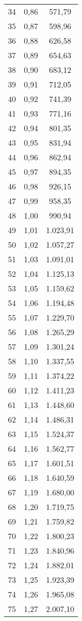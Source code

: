 \documentclass[]{article}
\begin{document}
\begin{longtable}[t]{ccc}
34 & 0,86 & 571,79\\
35 & 0,87 & 598,96\\
36 & 0,88 & 626,58\\
37 & 0,89 & 654,63\\
38 & 0,90 & 683,12\\
39 & 0,91 & 712,05\\
40 & 0,92 & 741,39\\
41 & 0,93 & 771,16\\
42 & 0,94 & 801,35\\
43 & 0,95 & 831,94\\
44 & 0,96 & 862,94\\
45 & 0,97 & 894,35\\
46 & 0,98 & 926,15\\
47 & 0,99 & 958,35\\
48 & 1,00 & 990,94\\
49 & 1,01 & 1.023,91\\
50 & 1,02 & 1.057,27\\
51 & 1,03 & 1.091,01\\
52 & 1,04 & 1.125,13\\
53 & 1,05 & 1.159,62\\
54 & 1,06 & 1.194,48\\
55 & 1,07 & 1.229,70\\
56 & 1,08 & 1.265,29\\
57 & 1,09 & 1.301,24\\
58 & 1,10 & 1.337,55\\
59 & 1,11 & 1.374,22\\
60 & 1,12 & 1.411,23\\
61 & 1,13 & 1.448,60\\
62 & 1,14 & 1.486,31\\
63 & 1,15 & 1.524,37\\
64 & 1,16 & 1.562,77\\
65 & 1,17 & 1.601,51\\
66 & 1,18 & 1.640,59\\
67 & 1,19 & 1.680,00\\
68 & 1,20 & 1.719,75\\
69 & 1,21 & 1.759,82\\
70 & 1,22 & 1.800,23\\
71 & 1,23 & 1.840,96\\
72 & 1,24 & 1.882,01\\
73 & 1,25 & 1.923,39\\
74 & 1,26 & 1.965,08\\
75 & 1,27 & 2.007,10\\

\end{longtable}
\end{document}
